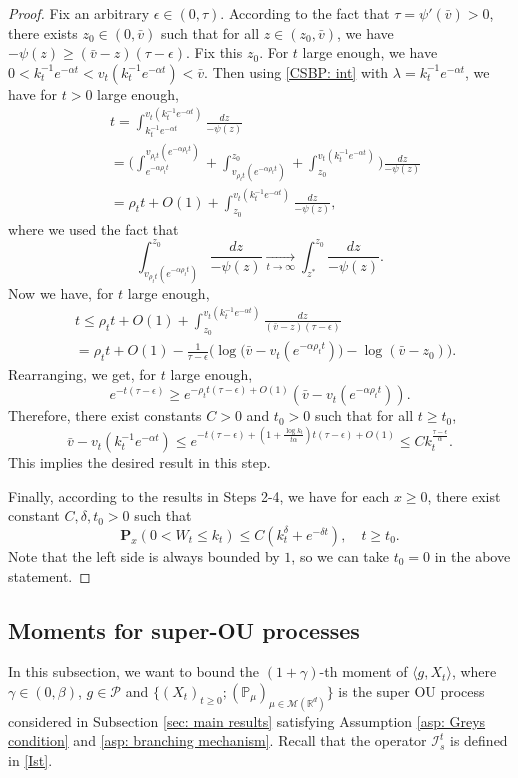 \documentclass[12pt,a4paper]{amsart}
\theoremstyle{plain}
\theoremstyle{definition}
\numberwithin{equation}{section}
\begin{document}
\begin{proof}
    Fix an arbitrary $\epsilon \in (0,\tau)$.
    According to the fact that $\tau=\psi'(\bar v)>0$, there exists $z_0 \in (0,\bar v)$ such that for all $z\in (z_0, \bar v)$, we have $-\psi(z)\geq (\bar v - z)(\tau- \epsilon)$.     Fix this $z_0$.
    For $t$ large enough, we have $0<k_t^{-1}e^{-\alpha t} < v_t(k_t^{-1}e^{-\alpha t})< \bar v$.
        Then using \eqref{CSBP: int} with $\lambda=k_t^{-1} e^{-\alpha t}$, we have for $t>0$ large enough,
\begin{align}
    &t =\int^{v_t(k_t^{-1} e^{-\alpha t})}_{k_t^{-1} e^{-\alpha t}}\frac{dz}{-\psi(z)}
    \\&= \Big(\int^{v_{\rho_t t}(e^{-\alpha \rho_t t})}_{e^{-\alpha \rho_t t}}  + \int^{z_0}_{v_{\rho_t t}(e^{-\alpha \rho_t t})} +\int^{v_t(k_t^{-1}e^{-\alpha  t})}_{z_0}\Big)\frac{dz}{-\psi(z)}
     \\&= \rho_t t + O(1) +\int^{v_t(k_t^{-1}e^{-\alpha t})}_{z_0} \frac{dz}{-\psi(z)},
\end{align}
    where we used the fact that
\[
    \int_{v_{\rho_t t}(e^{-\alpha \rho_tt})}^{z_0} \frac{dz}{-\psi(z)} \xrightarrow[t\to \infty] {}\int_{z^*}^{z_0} \frac{dz}{-\psi(z)}.
\]
    Now we have, for $t$ large enough,
\begin{align}
    &t\leq  \rho_t t + O(1)+ \int_{z_0}^{v_t(k_t^{-1}e^{-\alpha t})} \frac{dz}{(\bar v-z)(\tau - \epsilon)}
    \\&=  \rho_t t +O(1)- \frac{1}{\tau-\epsilon}\Big( \log \big(\bar v-v_t(e^{-\alpha \rho_t t})\big) - \log(\bar v-z_0)\Big).
\end{align}
    Rearranging, we get, for $t$ large enough,
\[
    e^{-t(\tau - \epsilon)} \geq e^{-\rho_t t(\tau - \epsilon)+O(1)}(\bar v - v_t(e^{-\alpha \rho_t t})).
\]
    Therefore, there exist constants $C>0$ and $t_0>0$ such that for all $t\geq t_0$,
\[
    \bar v - v_t(k_t^{-1} e^{-\alpha t}) \leq e^{-t(\tau -\epsilon)+ (1+\frac{\log k_t}{t\alpha})t(\tau - \epsilon)+O(1)}
    \leq Ck_t^{\frac{\tau - \epsilon}{\alpha}}.
\]
    This implies the desired result in this step.

    Finally, according to the results in Steps 2-4, we have for each $x\geq 0$, there exist constant $C, \delta, t_0 > 0$ such that
\[
    \mathbf P_{x}(0< W_t\leq k_t) \leq C(k_t^{\delta}+e^{-\delta t}),\quad t\geq t_0.
\]
Note that the left side is always bounded by $1$, so we can take $t_0 =0$ in the above statement.
\end{proof}

\subsection{Moments for super-OU processes}
\label{sec: Moments for super-OU processes}
    In this subsection,  we want to bound the $(1+\gamma)$-th moment of $\langle g ,X_t \rangle$, where $\gamma \in (0,\beta)$, $g\in \mathcal P$ and $\{(X_t)_{t\geq 0}; (\mathbb P_\mu)_{\mu \in \mathcal M(\mathbb R^d)}\}$ is the super OU process considered in Subsection \ref{sec: main results} satisfying Assumption \ref{asp: Greys condition} and \ref{asp: branching mechanism}.
    Recall that the operator $\mathcal{I}^t_s$ is defined in \ref{Ist}.
\end{document}
